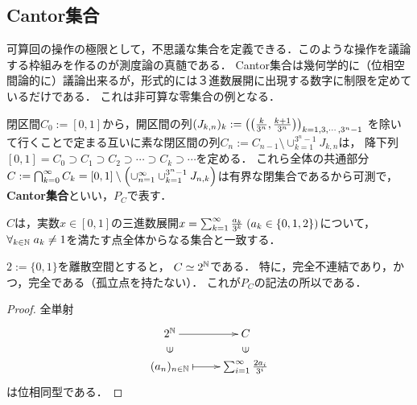 \documentclass[uplatex, dvipdfmx]{jsreport}
\begin{document}
\subsection{Cantor集合}

\begin{tcolorbox}[colframe=ForestGreen, colback=ForestGreen!10!white,breakable,colbacktitle=ForestGreen!40!white,coltitle=black,fonttitle=\bfseries\sffamily,
    title=連続体濃度のLebesgue零集合]
    可算回の操作の極限として，不思議な集合を定義できる．このような操作を議論する枠組みを作るのが測度論の真髄である．
    Cantor集合は幾何学的に（位相空間論的に）議論出来るが，形式的には３進数展開に出現する数字に制限を定めているだけである．
    これは非可算な零集合の例となる．
\end{tcolorbox}

\begin{definition}
    閉区間$C_0:=[0,1]$から，開区間の列$(J_{k,n})_{k}:=\left(\left(\frac{k}{3^n},\frac{k+1}{3^n}\right)\right)_{k=1,3,\cdots,3^n-1}$
    を除いて行くことで定まる互いに素な閉区間の列$C_n:=C_{n-1}\setminus\cup_{k=1}^{3^n-1}J_{k,n}$は，
    降下列$[0,1]=C_0\supset C_1\supset C_2\supset\cdots\supset C_k\supset\cdots$を定める．
    これら全体の共通部分$C:=\bigcap^\infty_{k=0}C_k=[0,1]\setminus\left(\cup_{n=1}^\infty\cup_{k=1}^{3^n-1}J_{n,k}\right)$は有界な閉集合であるから可測で，\textbf{Cantor集合}といい，$P_C$で表す．
\end{definition}

\begin{lemma}[三進数展開としての特徴付け]
    $C$は，実数$x\in[0,1]$の三進数展開$x=\sum_{k=1}^\infty\frac{a_k}{3^k}\;(a_k\in\{0,1,2\})$について，$\forall_{k\in\mathbb{N}}\;a_k\ne 1$を満たす点全体からなる集合と一致する．
\end{lemma}

\begin{proposition}[Cantor空間の位相]
    $2:=\{0,1\}$を離散空間とすると，
    $C\simeq 2^{\mathbb{N}}$である．
    特に，完全不連結であり，かつ，完全である（孤立点を持たない）．
    これが$P_C$の記法の所以である．
\end{proposition}
\begin{proof}
    全単射
    \[\xymatrix@R-2pc{
        2^\N\ar[r]&C\\
        \rotatebox[origin=c]{90}{$\in$}&\rotatebox[origin=c]{90}{$\in$}\\
        (a_n)_{n\in\N}\ar@{|->}[r]&\sumi\frac{2a_i}{3^i}
    }\]
    は位相同型である．
\end{proof}
\end{document}
